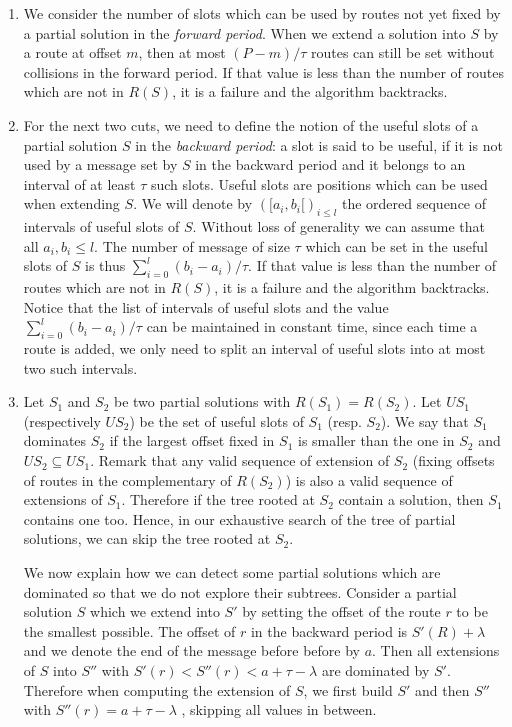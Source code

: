\documentclass[a4paper,10pt]{article}
\begin{document}
      \begin{enumerate}
       \item We consider the number of slots which can be used by routes not yet fixed by a partial solution in the 
       \emph{forward period}. When we extend a solution into $S$ by a route at offset $m$, then at most $(P - m) / \tau $ routes can still be set without collisions in the forward period. If that value is less than the number of routes which are not in $R(S)$, it is a failure and the algorithm backtracks.
       
       \item 
       For the next two cuts, we need to define the notion of the useful slots of a partial solution $S$ in the \emph{backward period}: a slot is said to be useful, if it is not used by a message set by $S$ in the backward period and it belongs to an interval of at least $\tau$ such slots. Useful slots are positions which can be used when extending $S$. We will denote by $([a_i,b_i[)_{i\leq l}$ the ordered sequence of intervals of useful slots of $S$. Without loss of generality we can assume that all $a_i, b_i \leq l$. The number of message of size $\tau$ which can be set in the useful slots of $S$ is thus  $\displaystyle{ \sum_{i=0}^{l} (b_{i} -a_i)/\tau } $. If that value is less than the number of routes which are not in $R(S)$, it is a failure and the algorithm backtracks. Notice that the list of intervals of useful slots and the value $\displaystyle{ \sum_{i=0}^{l} (b_{i} -a_i)/\tau } $ can be maintained in constant time, since each time a route is added, we only need to split an interval of useful slots into at most two such intervals.
       
       
       \item 
       Let $S_1$ and $S_2$ be two partial solutions with $R(S_1) = R(S_2)$. Let $US_1$ (respectively $US_2$) be the set of useful slots of $S_1$ (resp. $S_2$). We say that $S_1$ dominates $S_2$ if the largest offset fixed in $S_1$ is smaller than the one in $S_2$ and $US_2 \subseteq US_1$. Remark that any valid sequence of extension of $S_2$ (fixing offsets of routes in the complementary of 
       $R(S_2)$) is also a valid sequence of extensions of $S_1$. Therefore if the tree rooted at $S_2$ contain a solution, then $S_1$ contains one too. Hence, in our exhaustive search of the tree of partial solutions, we can skip the tree rooted at $S_2$.
       
       We now explain how we can detect some partial solutions which are dominated so that we do not explore their subtrees.
       Consider a partial solution $S$ which we extend into $S'$ by setting the offset of the route $r$ to be the smallest possible. The offset of $r$ in the backward period is $S'(R)+ \lambda$ and we denote the end of the message before before by $a$. Then all extensions of $S$ into $S''$ with $S'(r)  < S''(r) < a + \tau - \lambda$ are dominated by $S'$. Therefore when computing the extension of $S$, we first build $S'$ and then $S''$ with $S''(r) =  a + \tau - \lambda$ , skipping all values in between.
       
             \end{enumerate}
      
\end{document}

